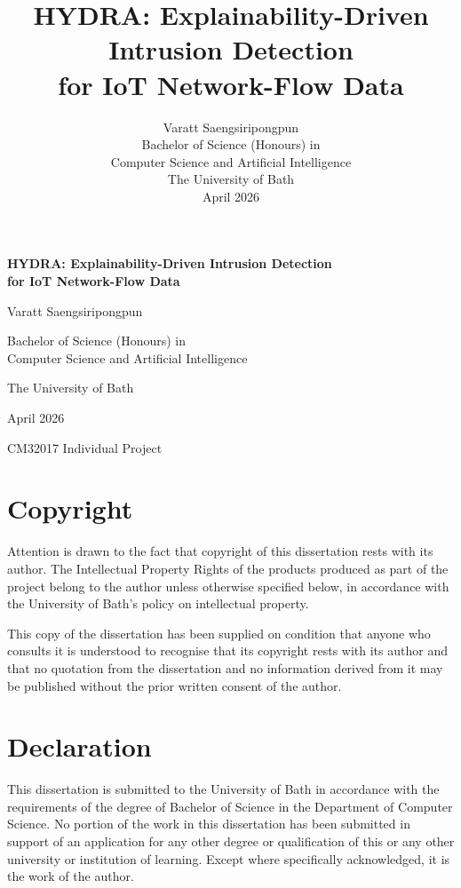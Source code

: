 \documentclass[12pt,a4paper]{report}
\title{\textbf{HYDRA: Explainability-Driven Intrusion Detection\\for IoT Network-Flow Data}}
\author{Varatt Saengsiripongpun\\[1em]
Bachelor of Science (Honours) in\\Computer Science and Artificial Intelligence\\[1em]
The University of Bath\\[1em]
April 2026}
\date{}
\begin{document}

\begin{titlepage}
\centering
\vspace*{2cm}
{\LARGE\bfseries HYDRA: Explainability-Driven Intrusion Detection\\[0.3em] for IoT Network-Flow Data\par}
\vspace{2cm}
{\Large Varatt Saengsiripongpun\par}
\vspace{1.5cm}
{\large Bachelor of Science (Honours) in\\Computer Science and Artificial Intelligence\par}
\vspace{1.5cm}
{\large The University of Bath\par}
\vspace{1cm}
{\large April 2026\par}
\vfill
{\normalsize CM32017 Individual Project\par}
\end{titlepage}

\newpage
\thispagestyle{empty}
\section*{Copyright}
Attention is drawn to the fact that copyright of this dissertation rests with its author. The Intellectual Property Rights of the products produced as part of the project belong to the author unless otherwise specified below, in accordance with the University of Bath's policy on intellectual property.

This copy of the dissertation has been supplied on condition that anyone who consults it is understood to recognise that its copyright rests with its author and that no quotation from the dissertation and no information derived from it may be published without the prior written consent of the author.

\section*{Declaration}
This dissertation is submitted to the University of Bath in accordance with the requirements of the degree of Bachelor of Science in the Department of Computer Science. No portion of the work in this dissertation has been submitted in support of an application for any other degree or qualification of this or any other university or institution of learning. Except where specifically acknowledged, it is the work of the author.
\end{document}
